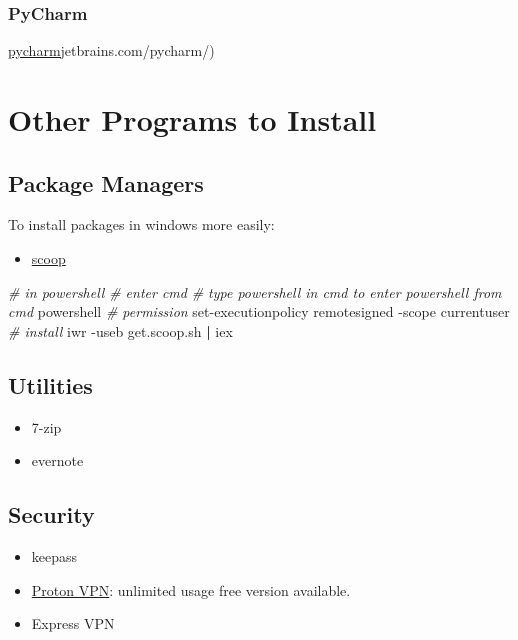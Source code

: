 \documentclass[]{article}
\newenvironment{Shaded}{\begin{snugshade}}{\end{snugshade}}
\newcommand{\CommentTok}[1]{\textcolor[rgb]{0.56,0.35,0.01}{\textit{#1}}}
\newcommand{\ExtensionTok}[1]{#1}
\newcommand{\KeywordTok}[1]{\textcolor[rgb]{0.13,0.29,0.53}{\textbf{#1}}}
\newcommand{\NormalTok}[1]{#1}
\providecommand{\tightlist}{%
  \setlength{\itemsep}{0pt}\setlength{\parskip}{0pt}}
\begin{document}
\hypertarget{pycharm}{%
\subsubsection{PyCharm}\label{pycharm}}

\href{https://www.}{pycharm}jetbrains.com/pycharm/)

\hypertarget{other-programs-to-install}{%
\section{Other Programs to Install}\label{other-programs-to-install}}

\hypertarget{package-managers}{%
\subsection{Package Managers}\label{package-managers}}

To install packages in windows more easily:

\begin{itemize}
\tightlist
\item
  \href{https://github.com/lukesampson/scoop/wiki/Quick-Start}{scoop}
\end{itemize}

\begin{Shaded}
\begin{Highlighting}[]
\CommentTok{# in powershell}
\CommentTok{# enter cmd}
\CommentTok{# type powershell in cmd to enter powershell from cmd}
\ExtensionTok{powershell}
\CommentTok{# permission}
\ExtensionTok{set-executionpolicy}\NormalTok{ remotesigned -scope currentuser}
\CommentTok{# install}
\ExtensionTok{iwr}\NormalTok{ -useb get.scoop.sh }\KeywordTok{|} \ExtensionTok{iex}
\end{Highlighting}
\end{Shaded}

\hypertarget{utilities}{%
\subsection{Utilities}\label{utilities}}

\begin{itemize}
\tightlist
\item
  7-zip
\item
  evernote
\end{itemize}

\hypertarget{security}{%
\subsection{Security}\label{security}}

\begin{itemize}
\tightlist
\item
  keepass
\item
  \href{https://protonvpn.com/}{Proton VPN}: unlimited usage free
  version available.
\item
  Express VPN
\end{itemize}
\end{document}
